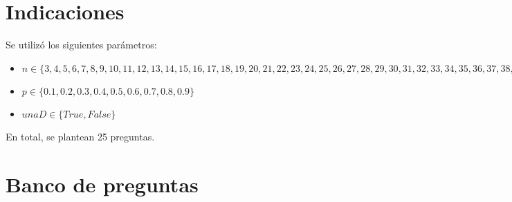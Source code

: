 \documentclass[a4,11pt]{aleph-notas}
\begin{document}
\encabezado

\section{Indicaciones}



Se utilizó los siguientes parámetros:
\begin{itemize}
	\item $n \in \{3, 4, 5, 6, 7, 8, 9, 10, 11, 12, 13, 14, 15, 16, 17, 18, 19, 20, 21, 22, 23, 24, 25, 26, 27, 28, 29, 30, 31, 32, 33, 34, 35, 36, 37, 38, 39, 40, 41, 42, 43, 44, 45, 46, 47, 48, 49, 50\}$
	\item $p \in \{0.1, 0.2, 0.3, 0.4, 0.5, 0.6, 0.7, 0.8, 0.9\}$
	\item $unaD \in \{True, False\}$

\end{itemize}
En total, se plantean 25 preguntas.


\section{Banco de preguntas}
\end{document}
